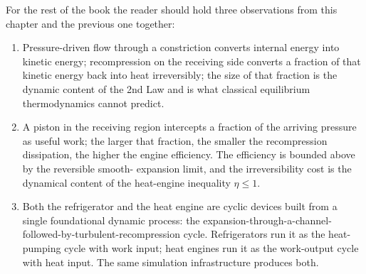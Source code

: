 For the rest of the book the reader should hold three observations
from this chapter and the previous one together:
\begin{enumerate}
\item Pressure-driven flow through a constriction converts internal
energy into kinetic energy; recompression on the receiving side
converts a fraction of that kinetic energy back into heat
irreversibly; the size of that fraction is the dynamic content of the
2nd Law and is what classical equilibrium thermodynamics cannot
predict.

\item A piston in the receiving region intercepts a fraction of the
arriving pressure as useful work; the larger that fraction, the
smaller the recompression dissipation, the higher the engine
efficiency. The efficiency is bounded above by the reversible smooth-
expansion limit, and the irreversibility cost is the dynamical content
of the heat-engine inequality $\eta \le 1$.

\item Both the refrigerator and the heat engine are cyclic devices
built from a single foundational dynamic process: the
expansion-through-a-channel-followed-by-turbulent-recompression cycle.
Refrigerators run it as the heat-pumping cycle with work input;
heat engines run it as the work-output cycle with heat input. The
same simulation infrastructure produces both.
\end{enumerate}

